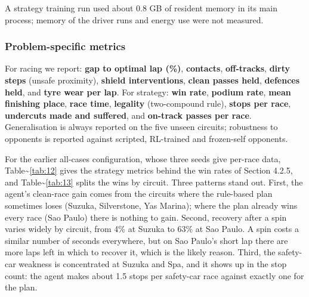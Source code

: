 \documentclass{ieeeaccess}
\begin{document}
A strategy training run used about 0.8 GB of resident memory in its main process; memory of the driver runs and energy use were not measured.

\subsubsection{Problem-specific metrics}

For racing we report: \textbf{gap to optimal lap (\%)}, \textbf{contacts}, \textbf{off-tracks},
\textbf{dirty steps} (unsafe proximity), \textbf{shield interventions}, \textbf{clean passes held},
\textbf{defences held}, and \textbf{tyre wear per lap}. For strategy: \textbf{win rate},
\textbf{podium rate}, \textbf{mean finishing place}, \textbf{race time}, \textbf{legality} (two-compound
rule), \textbf{stops per race}, \textbf{undercuts made and suffered}, and \textbf{on-track passes per
race}. Generalisation is always reported on the five unseen circuits; robustness
to opponents is reported against scripted, RL-trained and frozen-self opponents.

For the earlier all-cases configuration, whose three seeds give per-race data,
Table\textasciitilde{}\ref{tab:12} gives the strategy metrics behind the win rates of Section 4.2.5, and
Table\textasciitilde{}\ref{tab:13} splits the wins by circuit. Three patterns stand out. First, the agent's
clean-race gain comes from the circuits where the rule-based plan sometimes loses
(Suzuka, Silverstone, Yas Marina); where the plan already wins every race (Sao
Paulo) there is nothing to gain. Second, recovery after a spin varies widely by
circuit, from 4\% at Suzuka to 63\% at Sao Paulo. A spin costs a similar number of
seconds everywhere, but on Sao Paulo's short lap there are more laps left in which
to recover it, which is the likely reason. Third, the safety-car weakness is
concentrated at Suzuka and Spa, and it shows up in the stop count: the agent makes
about 1.5 stops per safety-car race against exactly one for the plan.
\end{document}

